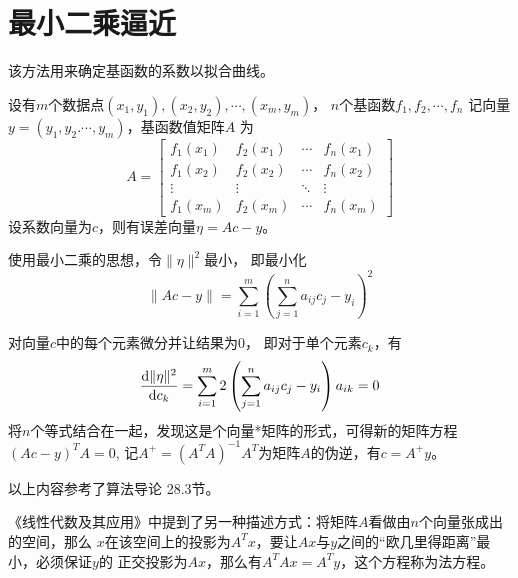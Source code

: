 \section{最小二乘逼近}
该方法用来确定基函数的系数以拟合曲线。

设有$m$个数据点$(x_1,y_1),(x_2,y_2),\cdots,(x_m,y_m)$，
$n$个基函数$f_1,f_2,\cdots,f_n$
记向量$y=(y_1,y_2.\cdots,y_m)$，基函数值矩阵$A$
为\begin{displaymath}
    A=\left[
    \begin{array}{cccc}
    f_1(x_1)&f_2(x_1)&\cdots&f_n(x_1)\\
    f_1(x_2)&f_2(x_2)&\cdots&f_n(x_2)\\
    \vdots&\vdots&\ddots&\vdots\\
    f_1(x_m)&f_2(x_m)&\cdots&f_n(x_m)
    \end{array}
    \right]
\end{displaymath}
设系数向量为$c$，则有误差向量$\eta=Ac-y$。

使用最小二乘的思想，令$\|\eta\|^2$最小，
即最小化
\begin{displaymath}
    \|Ac-y\|=\sum_{i=1}^m{\left(\sum_{j=1}^n{a_{ij}c_j}-y_i\right)}^2
\end{displaymath}

对向量$c$中的每个元素微分并让结果为0，
即对于单个元素$c_k$，有
\begin{displaymath}
    \frac{\textrm{d} \|\eta\|^2}{\textrm{d} c_k}=\sum_{i=1}^m{2\left(
        \sum_{j=1}^n{a_{ij}c_j-y_i}\right)a_{ik}}=0
\end{displaymath}
将$n$个等式结合在一起，发现这是个向量*矩阵的形式，可得新的矩阵方程$(Ac-y)^TA=0$,
记$A^+=(A^TA)^{-1}A^T$为矩阵$A$的伪逆，有$c=A^+y$。

以上内容参考了算法导论\cite{ITA3} 28.3节。

《线性代数及其应用》中提到了另一种描述方式：将矩阵$A$看做由$n$个向量张成出的空间，那么
$x$在该空间上的投影为$A^Tx$，要让$Ax$与$y$之间的``欧几里得距离''最小，必须保证$y$的
正交投影为$Ax$，那么有$A^TAx=A^Ty$，这个方程称为法方程。
